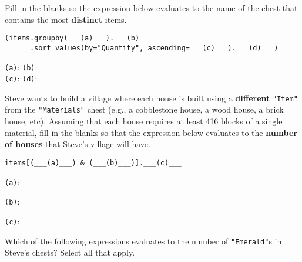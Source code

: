 \documentclass[twoside,12pt]{article}
\begin{document}
\begin{probset}

\begin{prob}

Fill in the blanks so the expression below evaluates to the name of the chest that contains the most \textbf{distinct} items.

\begin{verbatim}
(items.groupby(___(a)___).___(b)___
      .sort_values(by="Quantity", ascending=___(c)___).___(d)___)
\end{verbatim}

\texttt{(a)}:  \texttt{(b)}: \\ \texttt{(c)}:  \texttt{(d)}: 

\end{prob}

\bigskip


\begin{prob}

Steve wants to build a village where each house is built using a \textbf{different} \texttt{"Item"} from the \texttt{"Materials"} chest (e.g., a cobblestone house, a wood house, a brick house, etc). Assuming that each house requires at least 416 blocks of a single material, fill in the blanks so that the expression below evaluates to the \textbf{number of houses} that Steve's village will have.

\begin{verbatim}
items[(___(a)___) & (___(b)___)].___(c)___
\end{verbatim}

\vspace{1em}

\texttt{(a)}: 

\texttt{(b)}: 

\texttt{(c)}:  

\end{prob}

\newpage

\begin{prob}
    Which of the following expressions evaluates to the number of \texttt{"Emerald"}s in Steve's chests? Select all that apply. 


\end{prob}
\end{probset}
\end{document}
